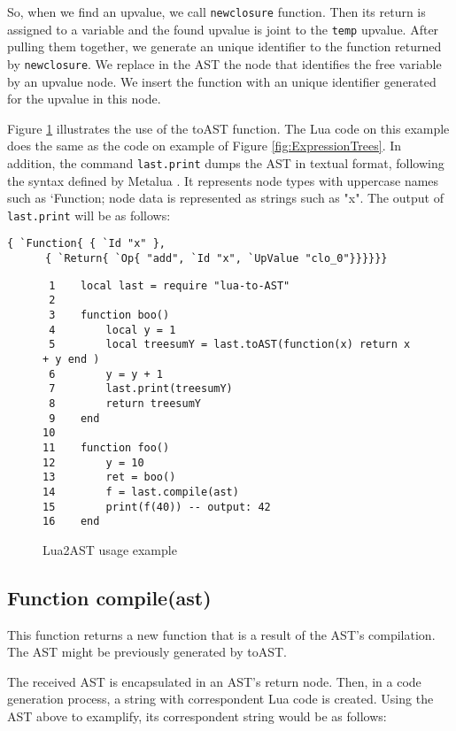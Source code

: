 \documentclass[english]{llncs}
\begin{document}
So, when we find an upvalue, we call \texttt{newclosure} function.
Then its return is assigned to a variable and the found upvalue is joint to the \texttt{temp} upvalue.
After pulling them together, we generate an unique identifier to the function returned by \texttt{newclosure}.
We replace in the AST the node that identifies the free variable by an upvalue node.
We insert the function with an unique identifier generated for the upvalue in this node.


Figure \ref{fig:Lua2ASTExemple} illustrates the use of the toAST function.
The Lua code on this example does the same as the code on example of Figure \ref{fig:ExpressionTrees}.
In addition, the command \texttt{last.print} dumps the AST in textual format, following the syntax defined by Metalua \cite{metalua}.
It represents node types with uppercase names such as `Function; node data is represented as strings such as "x".
The output of \texttt{last.print} will be as follows:
\begin{verbatim}
{ `Function{ { `Id "x" },
      { `Return{ `Op{ "add", `Id "x", `UpValue "clo_0"}}}}}}
\end{verbatim}


\begin{figure}[t]
\begin{verbatim}
 1    local last = require "lua-to-AST"
 2    
 3    function boo()
 4        local y = 1
 5        local treesumY = last.toAST(function(x) return x + y end )
 6        y = y + 1
 7        last.print(treesumY)
 8        return treesumY
 9    end
10    
11    function foo()	
12        y = 10
13        ret = boo()
14        f = last.compile(ast)
15        print(f(40)) -- output: 42
16    end
\end{verbatim}
\protect\caption{\label{fig:Lua2ASTExemple}Lua2AST usage example}
\end{figure}

\subsection{Function compile(ast) }

This function returns a new function that is a result of the AST's compilation. 
The AST might be previously generated by toAST.


The received AST is encapsulated in an AST's return node.
Then, in a code generation process, a string with correspondent Lua code is created.
Using the AST above to examplify, its correspondent string would be as follows:
\end{document}
